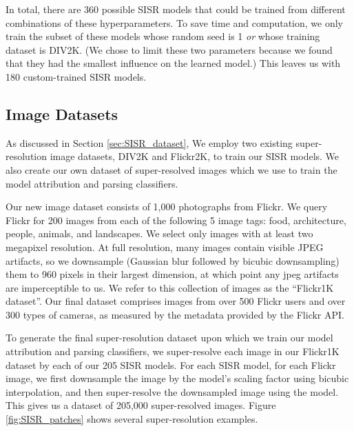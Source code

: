 \documentclass[10pt]{article} %
\begin{document}
In total, there are 360 possible SISR models that could be trained from different combinations of these hyperparameters.  To save time and computation, we only train the subset of these models whose random seed is 1 \textit{or} whose training dataset is DIV2K. (We chose to limit these two parameters because we found that they had the smallest influence on the learned model.) This leaves us with 180 custom-trained SISR models.

\subsection{Image Datasets}

As discussed in Section \ref{sec:SISR_dataset}, We employ two existing super-resolution image datasets, DIV2K and Flickr2K, to train our SISR models. We also create our own dataset of super-resolved images which we use to train the model attribution and parsing classifiers.

Our new image dataset consists of 1,000 photographs from Flickr. We query Flickr for 200 images from each of the following 5 image tags: food, architecture, people, animals, and landscapes. We select only images with at least two megapixel resolution. At full resolution, many images contain visible JPEG artifacts, so we downsample (Gaussian blur followed by bicubic downsampling) them to 960 pixels in their largest dimension, at which point any jpeg artifacts are imperceptible to us. We refer to this collection of images as the ``Flickr1K dataset''. Our final dataset comprises images from over 500 Flickr users and over 300 types of cameras, as measured by the metadata provided by the Flickr API.

To generate the final super-resolution dataset upon which we train our model attribution and parsing classifiers, we super-resolve each image in our Flickr1K dataset by each of our 205 SISR models. For each SISR model, for each Flickr image, we first downsample the image by the model's scaling factor using bicubic interpolation, and then super-resolve the downsampled image using the model. This gives us a dataset of 205,000 super-resolved images. Figure \ref{fig:SISR_patches} shows several super-resolution examples.

\newcommand{\patch}[1]{\texttt{[image: figures/SISR\_patch\_samples/\#1.png]}}
\end{document}

